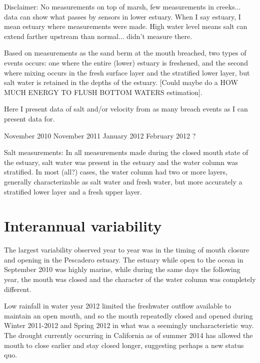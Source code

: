 {Disclaimer: No measurements on top of marsh, few measurements in
creeks... data can show what passes by sensors in lower estuary. When I
say estuary, I mean estuary where measurements were made. High water
level means salt can extend farther upstream than normal... didn't
measure there}.

Based on measurements as the sand berm at the mouth breached, two types
of events occurs: one where the entire (lower) estuary is freshened, and
the second where mixing occurs in the fresh surface layer and the
stratified lower layer, but salt water is retained in the depths of the
estuary. [Could maybe do a HOW MUCH ENERGY TO FLUSH BOTTOM WATERS
estimation].

Here I present data of salt and/or velocity from as many breach events
as I can present data for.
\begin{enumerate}
	\list November 2010
	\list November 2011 
	\list January 2012 
	\list February 2012
	?
\end{enumerate}

Salt measurements:
In all measurements made during the closed mouth state of the estuary, salt water was present in the estuary and the water column was stratified. In most (all?) cases, the water column had two or more layers, generally characterizable as salt water and fresh water, but more accurately a stratified lower layer and a fresh upper layer. 








\section{Interannual variability} \label{IntannVar}

The largest variability observed year to year was in the timing of mouth closure and opening in the Pescadero estuary. The estuary while open to the ocean in September 2010 was highly marine, while during the same days the following year, the mouth was closed and the character of the water column was completely different. 

Low rainfall in water year 2012 limited the freshwater outflow available to maintain an open mouth, and so the mouth repeatedly closed and opened during Winter 2011-2012 and Spring 2012 in what was a seemingly uncharacteristic way. The drought currently occurring in California as of summer 2014 has allowed the mouth to close earlier and stay closed longer, suggesting perhaps a new status quo. 

